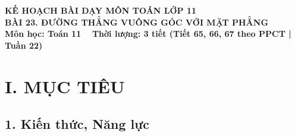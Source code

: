 \documentclass[12pt, a4paper]{article}
\begin{document}
\begin{center}
    {\fontsize{14pt}{17pt}\selectfont \textbf{KẾ HOẠCH BÀI DẠY MÔN TOÁN LỚP 11}}\\[6pt]
    {\fontsize{16pt}{19pt}\selectfont \textbf{BÀI 23. ĐƯỜNG THẲNG VUÔNG GÓC VỚI MẶT PHẲNG}}\\[4pt]
    {\fontsize{12pt}{15pt}\selectfont \textbf{Môn học: Toán 11} \ \textbar \ \textbf{Thời lượng: 3 tiết (Tiết 65, 66, 67 theo PPCT | Tuần 22)}}
\end{center}

\vspace{5pt}

\section*{I. MỤC TIÊU}

\subsection*{1. Kiến thức, Năng lực}
\end{document}
